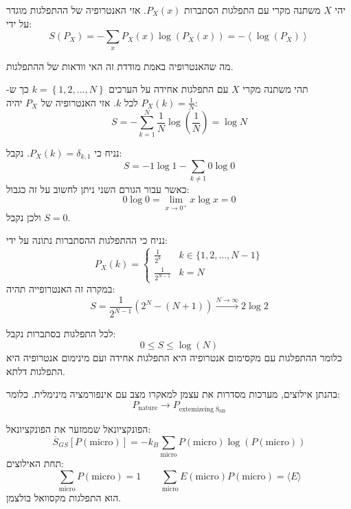\documentclass{tstextbook}
\begin{document}
\begin{definition}
יהי \(X\) משתנה מקרי עם התפלגות הסתברות \(P_{X}(x)\). אזי האנטרופיה של ההתפלגות מוגדר על ידי:
$$S(P_{X})=-\sum_{x}P_{X}\left(x\right)\log\left(P_{X}\left(x\right)\right)=-\left\langle\log\left(P_{X}\right)\right\rangle$$

\end{definition}
\begin{remark}
מה שהאנטרופיה באמת מודדת זה האי וודאות של ההתפלגות.

\end{remark}
\begin{example}
תהי משתנה מקרי \(X\) עם התפלגות אחידה על הערכים \(k=\left\{  1,2,\dots,N  \right\}\) כך ש-\(P_{X}(k)=\frac{1}{N}\) לכל \(k\). אזי האנטרופיה של \(P_{X}\) יהיה:
$$S=-\sum_{k=1}^{N} \frac{1}{N}\log\left( \frac{1}{N} \right)=\log N$$

\end{example}
\begin{example}
נניח כי \(P_{X}(k)=\delta_{k,1}\). נקבל:
$$S=-1\log 1 - \sum_{k\neq 1} 0 \log 0$$
כאשר עבור הגורם השני ניתן לחשוב על זה כגבול:
$$0\log 0 = \lim_{ x \to 0^{+} } x\log x=0$$
ולכן נקבל \(S=0\).

\end{example}
\begin{example}
נניח כי ההתפלגות ההסתברות נתונה על ידי:
$$P_{X}\left(k\right)=\begin{cases}\frac{1}{2^{k}} & k \in \{ 1,2,\dots,N-1 \} \\\frac{1}{2^{N-1}} & k=N
\end{cases}$$
במקרה זה האנטרופייה תהיה:
$$S=\frac{1}{2^{N-1}}(2^{N}-(N+1))\xrightarrow{N\to \infty}2\log 2$$

\end{example}
\begin{proposition}
לכל התפלגות בסתברות נקבל:
$$0\leq S\leq  \log(N)$$
כלומר ההתפלגות עם מקסימום אנטרופיה היא התפלגות אחידה ועם מינימום אנטרופיה היא התפלגות דלתא.

\end{proposition}
\begin{theorem}
בהנתן אילוצים, מערכות מסדרות את עצמן למאקרו מצב עם אינפורמציה מינימלית. כלומר:
$$P_{\text{nature}}\to P_{\mathrm{extemizeing \;\overline{S}_{SB} }}$$

\end{theorem}
\begin{proposition}
הפונקציונאל שממזער את הפונקציונאל:
$$\overline{S} _{GS}[P(\text{micro})]=-k_{B}\sum_{\text{micro}}P(\text{micro})\log(P(\text{micro}))$$
תחת האילוצים:
$$\sum_{\text{micro}}P(\text{micro})=1\qquad \sum_{\text{micro}}E(\text{micro})P(\text{micro})=\langle E \rangle$$
הוא התפלגות מקסוואל בולצמן.

\end{proposition}
\end{document}
